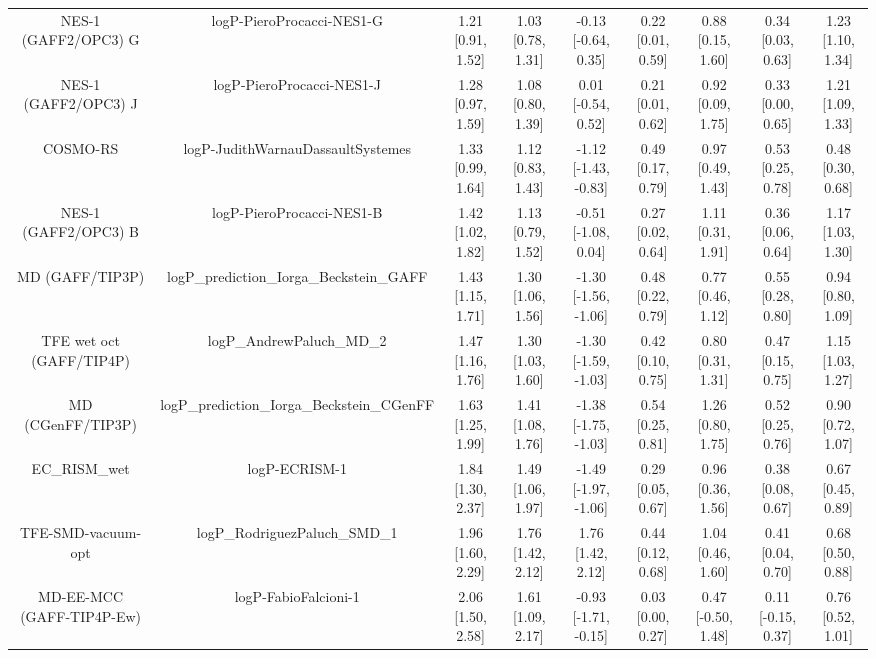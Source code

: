\documentclass{article}
\begin{document}
\begin{center}
\begin{longtable}{|ccccccccc|}
         NES-1 (GAFF2/OPC3) G &                      logP-PieroProcacci-NES1-G &  1.21 [0.91, 1.52] &  1.03 [0.78, 1.31] &   -0.13 [-0.64, 0.35] &  0.22 [0.01, 0.59] &     0.88 [0.15, 1.60] &     0.34 [0.03, 0.63] &     1.23 [1.10, 1.34] \\
         NES-1 (GAFF2/OPC3) J &                      logP-PieroProcacci-NES1-J &  1.28 [0.97, 1.59] &  1.08 [0.80, 1.39] &    0.01 [-0.54, 0.52] &  0.21 [0.01, 0.62] &     0.92 [0.09, 1.75] &     0.33 [0.00, 0.65] &     1.21 [1.09, 1.33] \\
                     COSMO-RS &              logP-JudithWarnauDassaultSystemes &  1.33 [0.99, 1.64] &  1.12 [0.83, 1.43] &  -1.12 [-1.43, -0.83] &  0.49 [0.17, 0.79] &     0.97 [0.49, 1.43] &     0.53 [0.25, 0.78] &     0.48 [0.30, 0.68] \\
         NES-1 (GAFF2/OPC3) B &                      logP-PieroProcacci-NES1-B &  1.42 [1.02, 1.82] &  1.13 [0.79, 1.52] &   -0.51 [-1.08, 0.04] &  0.27 [0.02, 0.64] &     1.11 [0.31, 1.91] &     0.36 [0.06, 0.64] &     1.17 [1.03, 1.30] \\
              MD (GAFF/TIP3P) &       logP\_prediction\_Iorga\_Beckstein\_GAFF &  1.43 [1.15, 1.71] &  1.30 [1.06, 1.56] &  -1.30 [-1.56, -1.06] &  0.48 [0.22, 0.79] &     0.77 [0.46, 1.12] &     0.55 [0.28, 0.80] &     0.94 [0.80, 1.09] \\
     TFE wet oct (GAFF/TIP4P) &                      logP\_AndrewPaluch\_MD\_2 &  1.47 [1.16, 1.76] &  1.30 [1.03, 1.60] &  -1.30 [-1.59, -1.03] &  0.42 [0.10, 0.75] &     0.80 [0.31, 1.31] &     0.47 [0.15, 0.75] &     1.15 [1.03, 1.27] \\
            MD (CGenFF/TIP3P) &     logP\_prediction\_Iorga\_Beckstein\_CGenFF &  1.63 [1.25, 1.99] &  1.41 [1.08, 1.76] &  -1.38 [-1.75, -1.03] &  0.54 [0.25, 0.81] &     1.26 [0.80, 1.75] &     0.52 [0.25, 0.76] &     0.90 [0.72, 1.07] \\
                  EC_RISM_wet &                                  logP-ECRISM-1 &  1.84 [1.30, 2.37] &  1.49 [1.06, 1.97] &  -1.49 [-1.97, -1.06] &  0.29 [0.05, 0.67] &     0.96 [0.36, 1.56] &     0.38 [0.08, 0.67] &     0.67 [0.45, 0.89] \\
           TFE-SMD-vacuum-opt &                  logP\_RodriguezPaluch\_SMD\_1 &  1.96 [1.60, 2.29] &  1.76 [1.42, 2.12] &     1.76 [1.42, 2.12] &  0.44 [0.12, 0.68] &     1.04 [0.46, 1.60] &     0.41 [0.04, 0.70] &     0.68 [0.50, 0.88] \\
    MD-EE-MCC (GAFF-TIP4P-Ew) &                           logP-FabioFalcioni-1 &  2.06 [1.50, 2.58] &  1.61 [1.09, 2.17] &  -0.93 [-1.71, -0.15] &  0.03 [0.00, 0.27] &    0.47 [-0.50, 1.48] &    0.11 [-0.15, 0.37] &     0.76 [0.52, 1.01] \\

\end{longtable}
\end{center}
\end{document}
